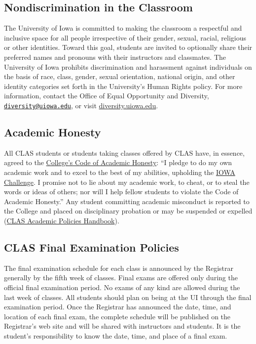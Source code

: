 \documentclass[11pt,]{article}
\theoremstyle{definition}
\theoremstyle{definition}
\theoremstyle{remark}
\begin{document}
\subsection{Nondiscrimination in the
Classroom}\label{nondiscrimination-in-the-classroom}

The University of Iowa is committed to making the classroom a respectful
and inclusive space for all people irrespective of their gender, sexual,
racial, religious or other identities. Toward this goal, students are
invited to optionally share their preferred names and pronouns with
their instructors and classmates. The University of Iowa prohibits
discrimination and harassment against individuals on the basis of race,
class, gender, sexual orientation, national origin, and other identity
categories set forth in the University's Human Rights policy. For more
information, contact the Office of Equal Opportunity and Diversity,
\href{mailto:diversity@uiowa.edu}{\nolinkurl{diversity@uiowa.edu}}, or
visit
\href{https://diversity.uiowa.edu/office/equal-opportunity-and-diversity}{diversity.uiowa.edu}.

\subsection{Academic Honesty}\label{academic-honesty}

All CLAS students or students taking classes offered by CLAS have, in
essence, agreed to the
\href{https://clas.uiowa.edu/students/handbook/academic-fraud-honor-code}{College's
Code of Academic Honesty}: ``I pledge to do my own academic work and to
excel to the best of my abilities, upholding the
\href{https://newstudents.uiowa.edu/iowa-challenge}{IOWA Challenge}. I
promise not to lie about my academic work, to cheat, or to steal the
words or ideas of others; nor will I help fellow students to violate the
Code of Academic Honesty.'' Any student committing academic misconduct
is reported to the College and placed on disciplinary probation or may
be suspended or expelled
(\href{https://clas.uiowa.edu/students/handbook}{CLAS Academic Policies
Handbook}).

\subsection{CLAS Final Examination
Policies}\label{clas-final-examination-policies}

The final examination schedule for each class is announced by the
Registrar generally by the fifth week of classes. Final exams are
offered only during the official final examination period. No exams of
any kind are allowed during the last week of classes. All students
should plan on being at the UI through the final examination period.
Once the Registrar has announced the date, time, and location of each
final exam, the complete schedule will be published on the Registrar's
web site and will be shared with instructors and students. It is the
student's responsibility to know the date, time, and place of a final
exam.
\end{document}
